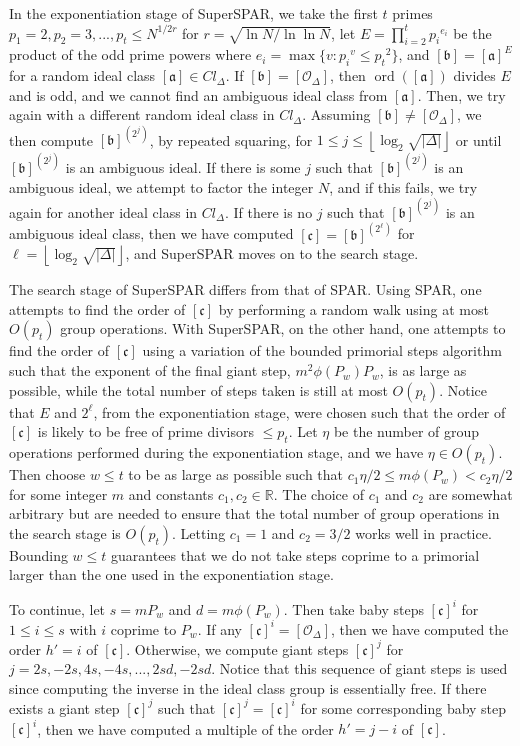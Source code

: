 \documentclass{ucalgthes1}
\theoremstyle{definition}
\DeclareMathOperator{\ord}{ord}
\newcommand{\RR}{\mathbb{R}}
\newcommand{\floor}[1]{\left\lfloor #1 \right\rfloor}
\newcommand{\ideal}{\mathfrak}
\newcommand{\idealclass}[1]{\left[ \ideal #1 \right]}
\newcommand{\aclass}{\idealclass a}
\newcommand{\bclass}{\idealclass b}
\newcommand{\cclass}{\idealclass c}
\newcommand{\idclass}{[\mathcal O_\Delta]}
\begin{document}
In the exponentiation stage of SuperSPAR, we take the first $t$ primes $p_1 = 2, p_2 = 3, ..., p_t \le N^{1/2r}$ for $r = \sqrt{\ln N / \ln \ln N}$, let $E = \prod_{i=2}^t {p_i}^{e_i}$ be the product of the odd prime powers where $e_i = \max \{ v : {p_i}^v \le {p_t}^2 \}$, and $\bclass = \aclass^E$ for a random ideal class $\aclass \in Cl_\Delta$.  If $\bclass = \idclass$, then $\ord(\aclass)$ divides $E$ and is odd, and we cannot find an ambiguous ideal class from $\aclass$.  Then, we try again with a different random ideal class in $Cl_\Delta$.  Assuming $\bclass \neq \idclass$, we then compute $\bclass^{\left(2^j\right)}$, by repeated squaring, for $1 \le j \le \floor{\log_2\sqrt{|\Delta|}}$ or until $\bclass^{\left(2^j\right)}$ is an ambiguous ideal.  If there is some $j$ such that $\bclass^{\left(2^j\right)}$ is an ambiguous ideal, we attempt to factor the integer $N$, and if this fails, we try again for another ideal class in $Cl_\Delta$.  If there is no $j$ such that $\bclass^{\left(2^j\right)}$ is an ambiguous ideal class, then we have computed $\cclass = {\bclass}^{\left(2^\ell\right)}$ for $\ell=\floor{\log_2 \sqrt{|\Delta|}}$, and SuperSPAR moves on to the search stage.

The search stage of SuperSPAR differs from that of SPAR.  Using SPAR, one attempts to find the order of $\cclass$ by performing a random walk using at most $O(p_t)$ group operations.  With SuperSPAR, on the other hand, one attempts to find the order of $\cclass$ using a variation of the bounded primorial steps algorithm such that the exponent of the final giant step, $m^2\phi(P_w)P_w$, is as large as possible, while the total number of steps taken is still at most $O(p_t)$.  Notice that $E$ and $2^\ell$, from the exponentiation stage, were chosen such that the order of $\cclass$ is likely to be free of prime divisors $\le p_t$.  Let $\eta$ be the number of group operations performed during the exponentiation stage, and we have $\eta \in O(p_t)$.  Then choose $w \le t$ to be as large as possible such that $c_1 \eta / 2 \le m\phi(P_w) < c_2 \eta / 2$ for some integer $m$ and constants $c_1, c_2 \in \RR$.  The choice of $c_1$ and $c_2$ are somewhat arbitrary but are needed to ensure that the total number of group operations in the search stage is $O(p_t)$.  Letting $c_1 = 1$ and $c_2 = 3/2$ works well in practice.  Bounding $w \le t$ guarantees that we do not take steps coprime to a primorial larger than the one used in the exponentiation stage.

To continue, let $s = mP_w$ and $d = m\phi(P_w)$.  Then take baby steps $\cclass^i$ for $1 \le i \le s$ with $i$ coprime to $P_w$.  If any $\cclass^i = \idclass$, then we have computed the order $h' = i$ of $\cclass$.  Otherwise, we compute giant steps $\cclass^j$ for $j=2s,-2s,4s,-4s,...,2sd,-2sd$.  Notice that this sequence of giant steps is used since computing the inverse in the ideal class group is essentially free.  If there exists a giant step $\cclass^j$ such that $\cclass^j = \cclass^i$ for some corresponding baby step $\cclass^i$, then we have computed a multiple of the order $h' = j - i$ of $\cclass$.  
\end{document}
